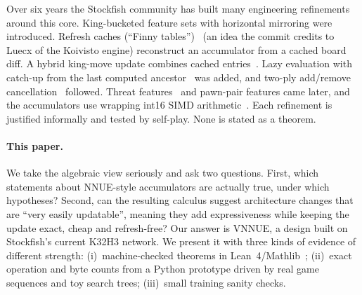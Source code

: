 \documentclass[10pt]{article}
\theoremstyle{plain}
\theoremstyle{definition}
\begin{document}
Over six years the Stockfish community has built many engineering refinements around this core.
King-bucketed feature sets with horizontal mirroring were introduced.
Refresh caches (``Finny tables'')~\cite{sffinny} (an idea the commit credits to Luecx of the Koivisto engine) reconstruct an accumulator from a cached board diff.
A hybrid king-move update combines cached entries~\cite{sfsource}.
Lazy evaluation with catch-up from the last computed ancestor~\cite{sfsource} was added, and two-ply add/remove cancellation~\cite{sfpr5988} followed.
Threat features~\cite{sfthreats} and pawn-pair features came later, and the accumulators use wrapping int16 SIMD arithmetic~\cite{sfsource}.
Each refinement is justified informally and tested by self-play.
None is stated as a theorem.

\paragraph{This paper.}
We take the algebraic view seriously and ask two questions.
First, which statements about NNUE-style accumulators are actually true, under which hypotheses?
Second, can the resulting calculus suggest architecture changes that are ``very easily updatable'', meaning they add expressiveness while keeping the update exact, cheap and refresh-free?
Our answer is VNNUE, a design built on Stockfish's current K32H3 network.
We present it with three kinds of evidence of different strength:
(i)~machine-checked theorems in Lean~4/Mathlib~\cite{demoura2021,mathlib2020};
(ii)~exact operation and byte counts from a Python prototype driven by real game sequences and toy search trees;
(iii)~small training sanity checks.
\end{document}
